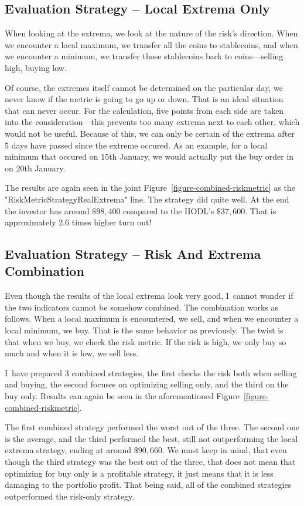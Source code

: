 \subsection*{Evaluation Strategy -- Local Extrema Only}
\label{subsection-local-extrema}
When looking at the extrema, we look at the nature of the risk's direction. When we encounter a local maximum, we transfer all the coins to stablecoins, and when we encounter a minimum, we transfer those stablecoins back to coins---selling high, buying low.

Of course, the extremes itself cannot be determined on the particular day, we never know if the metric is going to go up or down. That is an ideal situation that can never occur. For the calculation, five points from each side are taken into the consideration---this prevents too many extrema next to each other, which would not be useful. Because of this, we can only be certain of the extrema after 5 days have passed since the extreme occured. As an example, for a local minimum that occured on 15th January, we would actually put the buy order in on 20th January.

The results are again seen in the joint Figure~\ref{figure-combined-riskmetric} as the "RiskMetricStrategyRealExtrema" line. The strategy did quite well. At the end the investor has around $\$98,400$ compared to the HODL's $\$37,600$. That is approximately 2.6 times higher turn out!

\subsection*{Evaluation Strategy -- Risk And Extrema Combination}
Even though the results of the local extrema look very good, I~cannot wonder if the two indicators cannot be somehow combined. The combination works as follows. When a local maximum is encountered, we sell, and when we encounter a local minimum, we buy. That is the same behavior as previously. The twist is that when we buy, we check the risk metric. If the risk is high, we only buy so much and when it is low, we sell less.

I~have prepared 3 combined strategies, the first checks the risk both when selling and buying, the second focuses on optimizing selling only, and the third on the buy only. Results can again be seen in the aforementioned Figure~\ref{figure-combined-riskmetric}.

The first combined strategy performed the worst out of the three. The second one is the average, and the third performed the best, still not outperforming the local extrema strategy, ending at around $\$90,660$. We must keep in mind, that even though the third strategy was the best out of the three, that does not mean that optimizing for buy only is a profitable strategy, it just means that it is less damaging to the portfolio profit. That being said, all of the combined strategies outperformed the risk-only strategy.

